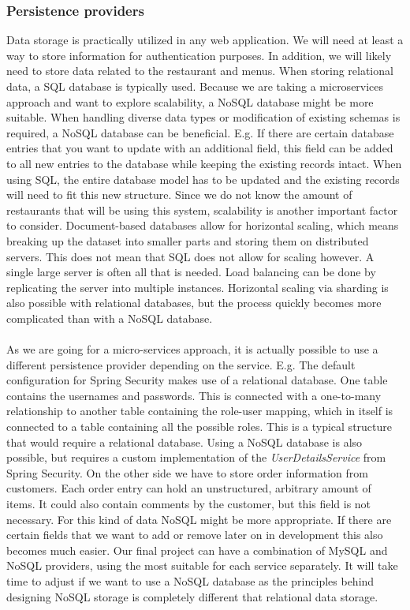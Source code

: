 \documentclass[12pt]{article}
\begin{document}
\begin{multicols}{2}
\subsubsection{Persistence providers}
Data storage is practically utilized in any web application. We will need at least a way to store information for authentication purposes. In addition, we will likely need to store data related to the restaurant and menus. When storing relational data, a SQL database is typically used. Because we are taking a microservices approach and want to explore scalability, a NoSQL database might be more suitable.\cite{MongodbVsMySQL92:online} When handling diverse data types or modification of existing schemas is required, a NoSQL database can be beneficial. E.g. If there are certain database entries that you want to update with an additional field, this field can be added to all new entries to the database while keeping the existing records intact. When using SQL, the entire database model has to be updated and the existing records will need to fit this new structure. Since we do not know the amount of restaurants that will be using this system, scalability is another important factor to consider. Document-based databases allow for horizontal scaling, which means breaking up the dataset into smaller parts and storing them on distributed servers. This does not mean that SQL does not allow for scaling however. A single large server is often all that is needed. Load balancing can be done by replicating the server into multiple instances. Horizontal scaling via sharding is also possible with relational databases, but the process quickly becomes more complicated than with a NoSQL database. \cite{sharding93:online}
\\\\
As we are going for a micro-services approach, it is actually possible to use a different persistence provider depending on the service. E.g. The default configuration for Spring Security makes use of a relational database. One table contains the usernames and passwords. This is connected with a one-to-many relationship to another table containing the role-user mapping, which in itself is connected to a table containing all the possible roles. This is a typical structure that would require a relational database. Using a NoSQL database is also possible, but requires a custom implementation of the \textit{UserDetailsService} from Spring Security. On the other side we have to store order information from customers. Each order entry can hold an unstructured, arbitrary amount of items. It could also contain comments by the customer, but this field is not necessary. For this kind of data NoSQL might be more appropriate. If there are certain fields that we want to add or remove later on in development this also becomes much easier. Our final project can have a combination of MySQL and NoSQL providers, using the most suitable for each service separately. It will take time to adjust if we want to use a NoSQL database as the principles behind designing NoSQL storage is completely different that relational data storage.

\end{multicols}
\end{document}
